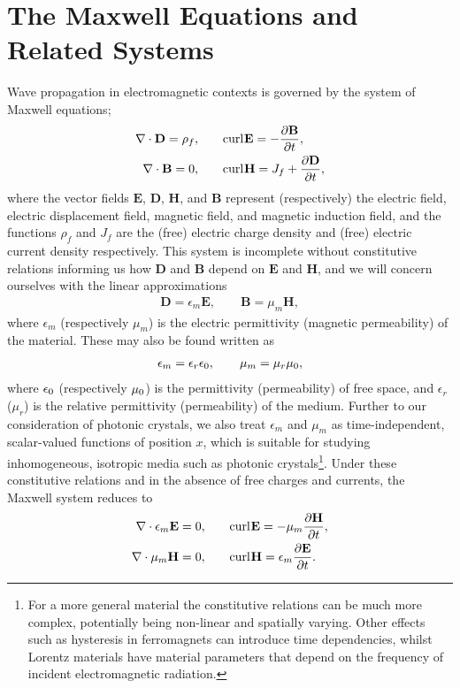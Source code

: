 \section{The Maxwell Equations and Related Systems} \label{sec:MathIntro}
Wave propagation in electromagnetic contexts is governed by the system of Maxwell equations;
\begin{align*}
	\nabla\cdot \mathbf{D} = \rho_f, &\qquad
	\mathrm{curl}_{}\mathbf{E} = -\dfrac{\partial \mathbf{B}}{\partial t}, \\
	\nabla\cdot \mathbf{B} = 0, &\qquad
	 \mathrm{curl}_{}\mathbf{H} = J_f + \dfrac{\partial \mathbf{D}}{\partial t},
\end{align*}
where the vector fields $\mathbf{E}$, $\mathbf{D}$, $\mathbf{H}$, and $\mathbf{B}$ represent (respectively) the electric field, electric displacement field, magnetic field, and magnetic induction field, and the functions $\rho_f$ and $J_f$ are the (free) electric charge density and (free) electric current density respectively.
This system is incomplete without constitutive relations informing us how $\mathbf{D}$ and $\mathbf{B}$ depend on $\mathbf{E}$ and $\mathbf{H}$, and we will concern ourselves with the linear approximations
\begin{align*}
	\mathbf{D} = \epsilon_m \mathbf{E}, \qquad \mathbf{B} = \mu_{m}\mathbf{H},
\end{align*}
where $\epsilon_m$ (respectively $\mu_m$) is the electric permittivity (magnetic permeability) of the material.
These may also be found written as
\begin{align*}
	\epsilon_{m} = \epsilon_{r}\epsilon_0, \qquad \mu_{m} = \mu_{r}\mu_0,
\end{align*}
where $\epsilon_0$ (respectively $\mu_0$) is the permittivity (permeability) of free space, and $\epsilon_{r}$ ($\mu_{r}$) is the relative permittivity (permeability) of the medium.
Further to our consideration of photonic crystals, we also treat $\epsilon_m$ and $\mu_m$ as time-independent, scalar-valued functions of position $x$, which is suitable for studying inhomogeneous, isotropic media such as photonic crystals\footnote{For a more general material the constitutive relations can be much more complex, potentially being non-linear and spatially varying. 
Other effects such as hysteresis in ferromagnets can introduce time dependencies, whilst Lorentz materials have material parameters that depend on the frequency of incident electromagnetic radiation.}.
Under these constitutive relations and in the absence of free charges and currents, the Maxwell system reduces to
\begin{align*}
	\nabla\cdot \epsilon_m \mathbf{E} = 0, &\qquad
	\mathrm{curl}_{}\mathbf{E} = -\mu_m\dfrac{\partial \mathbf{H}}{\partial t}, \\
	\nabla\cdot \mu_m \mathbf{H} = 0, &\qquad
	 \mathrm{curl}_{}\mathbf{H} = \epsilon_m \dfrac{\partial \mathbf{E}}{\partial t}.
\end{align*}
